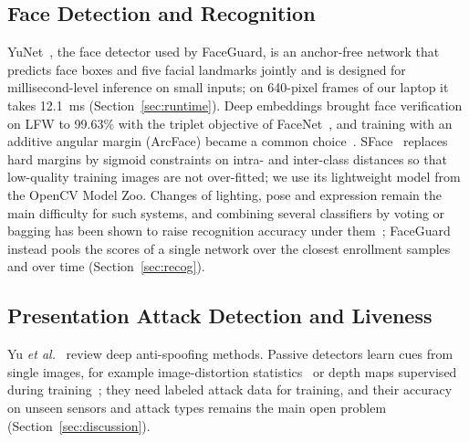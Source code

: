 \documentclass{ieeeaccess}
\begin{document}
\subsection{Face Detection and Recognition}
YuNet~\cite{wu2023yunet}, the face detector used by FaceGuard, is an anchor-free network that predicts face boxes and five facial landmarks jointly and is designed for millisecond-level inference on small inputs; on 640-pixel frames of our laptop it takes 12.1~ms (Section~\ref{sec:runtime}). Deep embeddings brought face verification on LFW to 99.63\% with the triplet objective of FaceNet~\cite{schroff2015facenet}, and training with an additive angular margin (ArcFace) became a common choice~\cite{deng2019arcface}. SFace~\cite{zhong2021sface} replaces hard margins by sigmoid constraints on intra- and inter-class distances so that low-quality training images are not over-fitted; we use its lightweight model from the OpenCV Model Zoo. Changes of lighting, pose and expression remain the main difficulty for such systems, and combining several classifiers by voting or bagging has been shown to raise recognition accuracy under them~\cite{gupta2024ensemble}; FaceGuard instead pools the scores of a single network over the closest enrollment samples and over time (Section~\ref{sec:recog}).

\subsection{Presentation Attack Detection and Liveness}
Yu \emph{et al.}~\cite{yu2023fassurvey} review deep anti-spoofing methods. Passive detectors learn cues from single images, for example image-distortion statistics~\cite{wen2015ida} or depth maps supervised during training~\cite{liu2018auxiliary}; they need labeled attack data for training, and their accuracy on unseen sensors and attack types remains the main open problem (Section~\ref{sec:discussion}).
\end{document}
